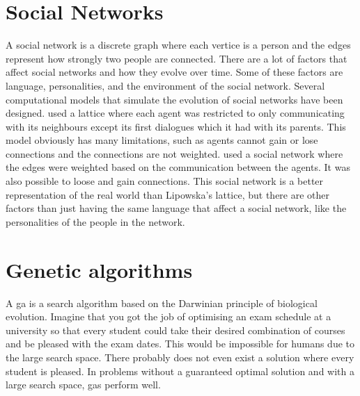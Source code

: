 \section{Social Networks}
A social network is a discrete graph where each vertice is a person and the edges represent how strongly two people are connected. There are a lot of factors that affect social networks and how they evolve over time. Some of these factors are language, personalities, and the environment of the social network. Several computational models that simulate the evolution of social networks have been designed. \citet{lipowska2011naming} used a lattice where each agent was restricted to only communicating with its neighbours except its first dialogues which it had with its parents. This model obviously has many limitations, such as agents cannot gain or lose connections and the connections are not weighted. 
\citet{lekvam2014co} used a social network where the edges were weighted based on the communication between the agents. It was also possible to loose and gain connections. This social network is a better representation of the real world than Lipowska's lattice, but there are other factors than just having the same language that affect a social network, like the personalities of the people in the network.



\section{Genetic algorithms} \label{GAalgorithm}
A \ac{ga} is a search algorithm based on the Darwinian principle of biological evolution. Imagine that you got the job of optimising an exam schedule at a university so that every student could take their desired combination of courses and be pleased with the exam dates. This would be impossible for humans due to the large search space. There probably does not even exist a solution where every student is pleased. In problems without a guaranteed optimal solution and with a large search space, \ac{ga}s perform well.

